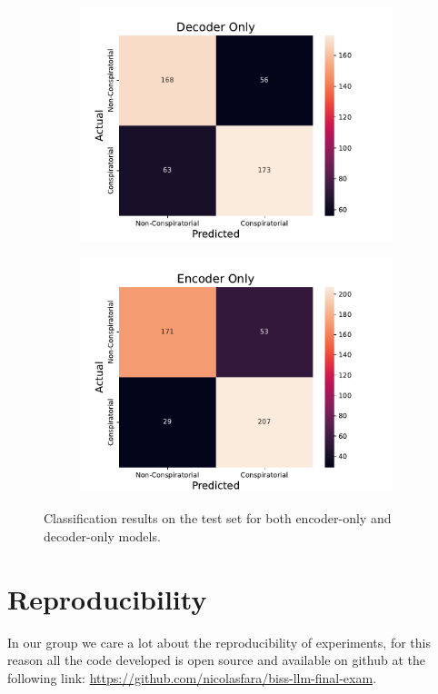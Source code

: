 \documentclass[11pt]{article}
\begin{document}
\begin{figure}[!t]
    \begin{subfigure}{\columnwidth}
        \includegraphics[width=\textwidth]{figures/decoder-only-confusion-matrix.pdf}
    \end{subfigure}
    \begin{subfigure}{\columnwidth}
        \includegraphics[width=\textwidth]{figures/encoder-only-confusion-matrix.pdf}
    \end{subfigure}
    \caption{Classification results on the test set for both encoder-only and decoder-only models.}
    \label{fig:confusion-matrix}
\end{figure}

\section{Reproducibility}
In our group we care a lot about the reproducibility of experiments, for this reason all the code developed is 
open source and available on github at the following link: \url{https://github.com/nicolasfara/biss-llm-final-exam}.





\end{document}
